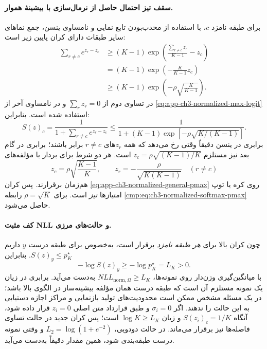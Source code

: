 \paragraph{سقف تیز احتمال حاصل از نرمال‌سازی با بیشینهٔ هموار.}
برای طبقه نامزد $c$،
با استفاده از محدب‌بودن
تابع نمایی و نامساوی ینسن،
جمع نماهای سایر طبقات
دارای کران پایین زیر است:
\begin{equation}\label{eq:app-ch3-normalized-competitor-jensen}
\begin{aligned}
\sum_{r\ne c}e^{z_r-z_c}
&\ge(K-1)\exp\left(
\frac{\sum_{r\ne c}z_r}{K-1}-z_c
\right)\\
&=(K-1)\exp\left(
-\frac{K}{K-1}z_c
\right)\\
&\ge(K-1)\exp\left(
-\rho\sqrt{\frac K{K-1}}
\right).
\end{aligned}
\end{equation}
در تساوی دوم از
$\sum_rz_r=0$ و در
نامساوی آخر از
\eqref{eq:app-ch3-normalized-max-logit}
استفاده شده است. بنابراین:
\begin{equation}\label{eq:app-ch3-normalized-general-pmax}
\boxed{
S(z)_c
=\frac1{1+\sum_{r\ne c}e^{z_r-z_c}}
\le
\frac1{1+(K-1)
\exp[-\rho\sqrt{K/(K-1)}]}.
}
\end{equation}
برابری در ینسن دقیقاً
وقتی رخ می‌دهد که
همه $z_r$های $r\ne c$
برابر باشند؛ برابری در
گام بعد نیز مستلزم
$z_c=\rho\sqrt{(K-1)/K}$
است. هر دو شرط برای
بردار با مؤلفه‌های
\[
z_c=\rho\sqrt{\frac{K-1}K},
\qquad
z_r=-\frac{\rho}{\sqrt{K(K-1)}}
\quad(r\ne c)
\]
هم‌زمان برقرارند.
پس کران
\eqref{eq:app-ch3-normalized-general-pmax}
روی کره یا توپ امتیازها
\emph{تیز} است.
برای $\rho=\sqrt K$
رابطه
\eqref{cmp:eq:ch3-normalized-softmax-pmax}
حاصل می‌شود.

\paragraph{کف مثبت NLL و حالت‌های مرزی.}
چون کران بالا برای
\emph{هر طبقه نامزد}
برقرار است، به‌خصوص برای
طبقه درست $y$ داریم
$S(z)_y\le p_K^\star$.
بنابراین
\[
-\log S(z)_y
\ge-\log p_K^\star=L_K>0.
\]
با میانگین‌گیری وزن‌دار
روی نمونه‌ها،
$NLL_{\mathrm{norm},\Omega}\ge L_K$
به‌دست می‌آید. برابری در
زیان یک نمونه مستلزم
آن است که طبقه درست
همان مؤلفه بیشینه‌ساز
در الگوی بالا باشد؛
در یک مسئله مشخص ممکن است
محدودیت‌های تولید بازنمایی
و مراکز اجازه دستیابی
به این حالت را ندهند.
اگر $\sigma_i=0$ و
طبق قرارداد متن اصلی
$z_i=0$ قرار داده شود،
آنگاه $S(z_i)_c=1/K$
و زیان $\log K\ge L_K$
است؛ پس کران جدید
در حالت تساوی فاصله‌ها
نیز برقرار می‌ماند.
در حالت دودویی،
$L_2=\log(1+e^{-2})$
و وقتی نمونه درست
طبقه‌بندی شود،
همین مقدار دقیقاً به‌دست
می‌آید.

